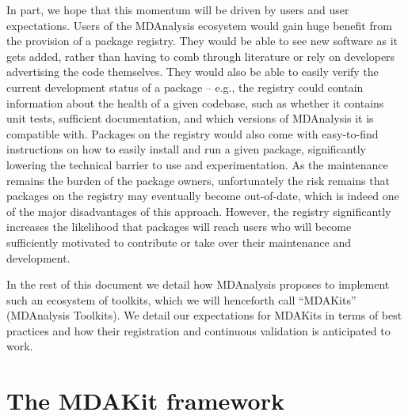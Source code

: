 \documentclass[9pt,whitepaper]{livecoms}
\begin{document}
In part, we hope that this momentum will be driven by users and user expectations. Users of the MDAnalysis ecosystem would gain huge benefit from the provision of a package registry. They would be able to see new software as it gets added, rather than having to comb through literature or rely on developers advertising the code themselves. They would also be able to easily verify the current development status of a package – e.g., the registry could contain information about the health of a given codebase, such as whether it contains unit tests, sufficient documentation, and which versions of MDAnalysis it is compatible with. Packages on the registry would also come with easy-to-find instructions on how to easily install and run a given package, significantly lowering the technical barrier to use and experimentation. As the maintenance remains the burden of the package owners, unfortunately the risk remains that packages on the registry may eventually become out-of-date, which is indeed one of the major disadvantages of this approach. However, the registry significantly increases the likelihood that packages will reach users who will become sufficiently motivated to contribute or take over their maintenance and development.

In the rest of this document we detail how MDAnalysis proposes to implement such an ecosystem of toolkits, which we will henceforth call “MDAKits” (MDAnalysis Toolkits). We detail our expectations for MDAKits in terms of best practices and how their registration and continuous validation is anticipated to work.

\section{The MDAKit framework}
\label{sec:mdakitframework}
\end{document}
